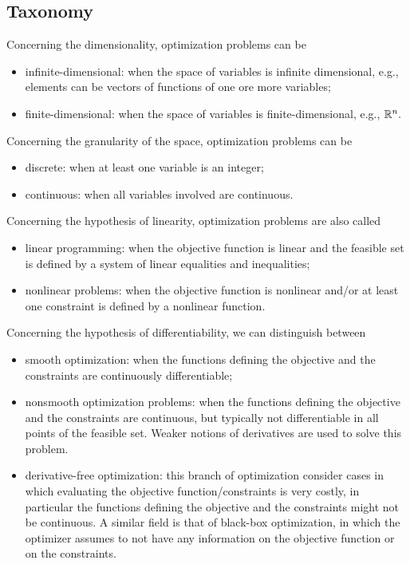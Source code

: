 \documentclass[10pt,a4paper]{article}
\begin{document}
\subsection{Taxonomy}
Concerning the dimensionality, optimization problems can be 
\begin{itemize}
	\item infinite-dimensional: when the space of variables is infinite dimensional, e.g., elements can be vectors of functions of one ore more variables;
	\item finite-dimensional: when the space of variables is finite-dimensional, e.g., $\mathbb{R}^n.$
\end{itemize}
Concerning the granularity of the space, optimization problems can be 
\begin{itemize}
	\item discrete: when at least one variable is an integer;
	\item continuous: when all variables involved are continuous.
\end{itemize}
Concerning the hypothesis of linearity, optimization problems are also called
\begin{itemize}
\item linear programming: when the objective function is linear and the
feasible set is defined by a system of linear equalities and inequalities;
\item nonlinear problems: when the objective function is nonlinear
and/or at least one constraint is defined by a nonlinear function.
\end{itemize}
Concerning the hypothesis of differentiability, we can distinguish between
\begin{itemize}
\item smooth optimization: when the functions defining the objective
and the constraints are continuously differentiable;
\item nonsmooth optimization problems: when the functions defining the objective and the constraints are continuous, but typically not differentiable in all points of the feasible set. Weaker notions of derivatives are used to solve this problem.
\item derivative-free optimization: this branch of optimization consider cases in which evaluating the objective function/constraints is very costly, in particular the functions defining the objective and the constraints might not be continuous. A similar field is that of black-box optimization, in which the optimizer assumes to not have any information on the objective function or on the constraints.
\end{itemize}
\end{document}
